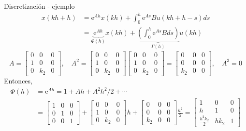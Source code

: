 \documentclass[presentation,aspectratio=1610]{beamer}
\begin{document}
\begin{frame}[label={sec:orgd4c9dc3}]{Discretización - ejemplo}
 \begin{align*}
  x(kh+h) &= \mathrm{e}^{Ah} x(kh) + \int_{0}^{h} \mathrm{e}^{As} B u(kh+h-s) ds\\
   &= \underbrace{\mathrm{e}^{Ah}}_{\Phi(h)} x(kh) + \underbrace{\left(\int_{0}^h \mathrm{e}^{As} B ds \right)}_{\Gamma(h)} u(kh)
\end{align*}
\[ A = \begin{bmatrix} 0 & 0 & 0\\1 & 0 & 0\\0 & k_2 & 0\end{bmatrix}, \quad A^2 = \begin{bmatrix} 0 & 0 & 0\\1 & 0 & 0\\0 & k_2 & 0\end{bmatrix}\begin{bmatrix} 0 & 0 & 0\\1 & 0 & 0\\0 & k_2 & 0\end{bmatrix}= \begin{bmatrix} 0 & 0 & 0\\0 & 0 & 0\\k_2 & 0  & 0\end{bmatrix}, \quad A^3 = 0\]
Entonces,
\begin{align*}
 \Phi(h) &= \mathrm{e}^{Ah} = 1 + Ah + A^2 h^2/2  + \cdots \\
 &= \begin{bmatrix} 1 & 0 & 0\\0 & 1 & 0\\0 & 0 & 1\end{bmatrix} + \begin{bmatrix} 0 & 0 & 0\\1 & 0 & 0\\0 & k_2 & 0\end{bmatrix}h + \begin{bmatrix} 0 & 0 & 0\\0 & 0 & 0\\k_2 & 0 & 0\end{bmatrix}\frac{h^ 2}{2}= \begin{bmatrix} 1 & 0 & 0\\h & 1 & 0\\\frac{h^2k_2}{2} & hk_2 & 1\end{bmatrix}
 \end{align*}
\end{frame}
\end{document}
